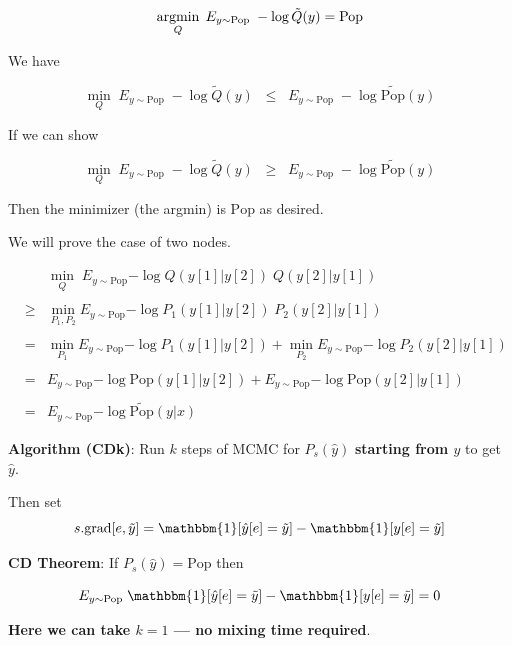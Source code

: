 {

$$\operatorname*{argmin}_Q \; E_{y \sim \mathrm{Pop}} \;-\log \tilde{Q}(y) = \mathrm{Pop}$$

\vfill


We have

$$\min_{Q} \;E_{y \sim \mathrm{Pop}}\;-\log \tilde{Q}(y) \;\;\leq \;\; E_{y \sim \mathrm{Pop}}\;-\log \widetilde{\mathrm{Pop}}(y)$$

\vfill
If we can show

$$\min_{Q} \;E_{y \sim \mathrm{Pop}}\;-\log \tilde{Q}(y) \;\;\geq \;\; E_{y \sim \mathrm{Pop}}\;-\log \widetilde{\mathrm{Pop}}(y)$$

Then the minimizer (the argmin) is $\mathrm{Pop}$ as desired.


We will prove the case of two nodes.

\vfill
\begin{eqnarray*}
  & & \min_Q \;E_{y\sim \mathrm{Pop}}{-\log Q(y[1]|y[2])\;Q(y[2]|y[1])} \\
  \\
  & \geq & \min_{P_1,P_2} E_{y \sim \mathrm{Pop}}{-\log P_1(y[1]|y[2])\;P_2(y[2]|y[1])} \\
  \\
  & = & \min_{P_1} E_{y \sim \mathrm{Pop}}{-\log P_1(y[1]|y[2])} + \min_{P_2} E_{y \sim \mathrm{Pop}}{-\log P_2(y[2]|y[1])} \\
  \\
  & = & E_{y \sim \mathrm{Pop}}{-\log \mathrm{Pop}(y[1]|y[2])} + E_{y \sim \mathrm{Pop}}{-\log \mathrm{Pop}(y[2]|y[1])} \\
  \\
  & = & E_{y \sim \mathrm{Pop}}{-\log \widetilde{\mathrm{Pop}}(y|x)}
\end{eqnarray*}

  
{\bf Algorithm (CDk)}: Run $k$ steps of MCMC for $P_s(\hat{y})$ {\bf starting from $y$} to get $\hat{y}$.

\vfill
Then set
$$s.\mathrm{grad}[e,\tilde{y}] = \mathbbm{1}[\hat{y}[e] = \tilde{y}] - \mathbbm{1}[y[e]= \tilde{y}]$$

\vfill
    {\bf CD Theorem}: If $P_s(\hat{y}) = \mathrm{Pop}$ then
    
    $$E_{y \sim \mathrm{Pop}}\; \mathbbm{1}[\hat{y}[e] = \tilde{y}] - \mathbbm{1}[y[e]= \tilde{y}] = 0$$

\vfill
{\bf Here we can take $k=1$ --- \bf no mixing time required}.



}

